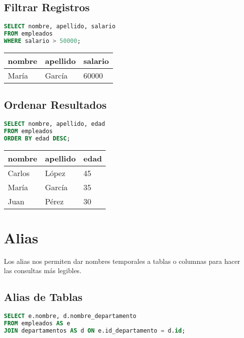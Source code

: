 \documentclass[12pt]{article}
\begin{document}
\subsection{Filtrar Registros}
\begin{lstlisting}[language=SQL]
SELECT nombre, apellido, salario
FROM empleados
WHERE salario > 50000;
\end{lstlisting}

\begin{center}
\begin{tabular}{lll}
\toprule
nombre & apellido & salario \\
\midrule
María & García & 60000 \\
\bottomrule
\end{tabular}
\end{center}

\subsection{Ordenar Resultados}
\begin{lstlisting}[language=SQL]
SELECT nombre, apellido, edad
FROM empleados
ORDER BY edad DESC;
\end{lstlisting}

\begin{center}
\begin{tabular}{lll}
\toprule
nombre & apellido & edad \\
\midrule
Carlos & López & 45 \\
María & García & 35 \\
Juan & Pérez & 30 \\
\bottomrule
\end{tabular}
\end{center}

\section{Alias}
Los alias nos permiten dar nombres temporales a tablas o columnas para hacer las consultas más legibles.

\subsection{Alias de Tablas}
\begin{lstlisting}[language=SQL]
SELECT e.nombre, d.nombre_departamento
FROM empleados AS e
JOIN departamentos AS d ON e.id_departamento = d.id;
\end{lstlisting}
\end{document}
